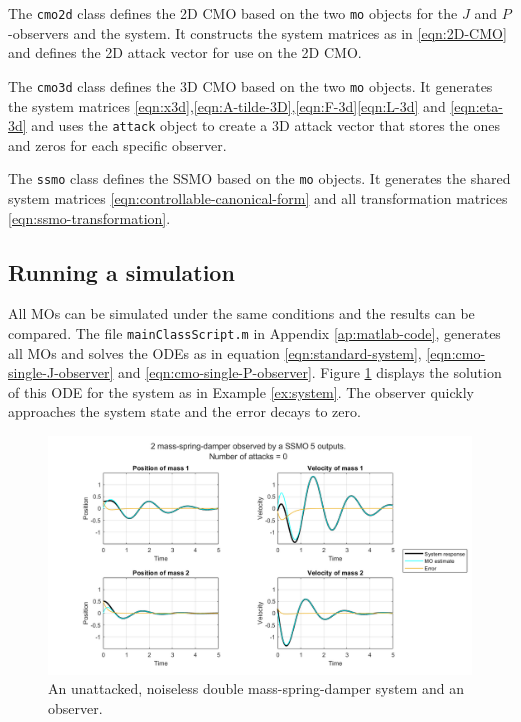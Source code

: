 The \texttt{cmo2d} class defines the 2D CMO based on the two \texttt{mo} objects for the $J$ and $P$-observers and the system.  It constructs the system matrices as in \eqref{eqn:2D-CMO} and defines the 2D attack vector for use on the 2D CMO.

The \texttt{cmo3d} class defines the 3D CMO based on the two \texttt{mo} objects. It generates the system matrices \eqref{eqn:x3d},\eqref{eqn:A-tilde-3D},\eqref{eqn:F-3d}\eqref{eqn:L-3d} and \eqref{eqn:eta-3d} and uses the \texttt{attack} object to create a 3D attack vector that stores the ones and zeros for each specific observer.

The \texttt{ssmo} class defines the SSMO based on the \texttt{mo} objects. It generates the shared system matrices \eqref{eqn:controllable-canonical-form} and all transformation matrices \eqref{eqn:ssmo-transformation}. 

\subsection{Running a simulation}
All MOs can be simulated under the same conditions and the results can be compared. The file \texttt{mainClassScript.m} in Appendix \ref{ap:matlab-code}, generates all MOs and solves the ODEs as in equation \eqref{eqn:standard-system}, \eqref{eqn:cmo-single-J-observer} and \eqref{eqn:cmo-single-P-observer}. Figure \ref{fig:unattacked-system-plot} displays the solution of this ODE for the system as in Example \ref{ex:system}. The observer quickly approaches the system state and the error decays to zero.

\newpage
\begin{figure}[H]
    \centering
    \includegraphics[width=\linewidth]{report/Figures/symplot_5o0a.png}
    \caption{An unattacked, noiseless double mass-spring-damper system and an observer.}
    \label{fig:unattacked-system-plot}
\end{figure}

